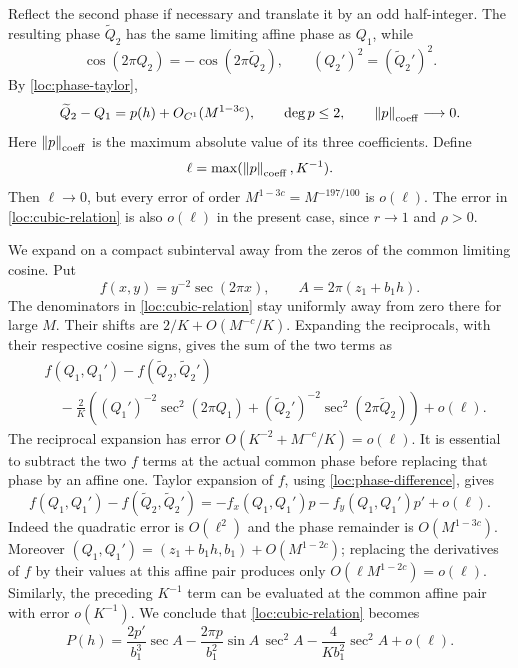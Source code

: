 Reflect the second phase if necessary and translate it by an odd
half-integer. The resulting phase $\widetilde Q_2$ has the same
limiting affine phase as $Q_1$, while
\[
 \cos(2\pi Q_2)=-\cos(2\pi\widetilde Q_2),\qquad
 (Q_2')^2=(\widetilde Q_2')^2.
\]
By \cref{loc:phase-taylor},
\begin{equation}
 \widetilde Q_2-Q_1=p(h)+O_{C^1}(M^{1-3c}),\qquad
 \deg p\le2,\qquad \left\lVert p\right\rVert_{\rm coeff}\longrightarrow0.
 \label{loc:phase-difference}
\end{equation}
Here $\left\lVert p\right\rVert_{\rm coeff}$ is the maximum absolute value of its
three coefficients. Define
\[
 \ell=\max(\left\lVert p\right\rVert_{\rm coeff},K^{-1}).
\]
Then $\ell\to0$, but every error of order $M^{1-3c}=M^{-197/100}$
is $o(\ell)$. The error in \cref{loc:cubic-relation} is also
$o(\ell)$ in the present case, since $r\to1$ and $\rho>0$.

We expand on a compact subinterval away from the zeros of the common
limiting cosine. Put
\[
 f(x,y)=y^{-2}\sec(2\pi x),\qquad
 A=2\pi(z_1+b_1h).
\]
The denominators in \cref{loc:cubic-relation} stay uniformly away
from zero there for large $M$. Their shifts are
$2/K+O(M^{-c}/K)$. Expanding the reciprocals, with their respective
cosine signs, gives the sum of the two terms as
\begin{align*}
 &f(Q_1,Q_1')-f(\widetilde Q_2,\widetilde Q_2')\\
 &\quad-\frac2K\left((Q_1')^{-2}\sec^2(2\pi Q_1)
            +(\widetilde Q_2')^{-2}\sec^2(2\pi\widetilde Q_2)\right)
       +o(\ell).
\end{align*}
The reciprocal expansion has error $O(K^{-2}+M^{-c}/K)=o(\ell)$.
It is essential to subtract the two $f$ terms at the actual common
phase before replacing that phase by an affine one. Taylor expansion
of $f$, using \cref{loc:phase-difference}, gives
\[
 f(Q_1,Q_1')-f(\widetilde Q_2,\widetilde Q_2')
 =-f_x(Q_1,Q_1')p-f_y(Q_1,Q_1')p'+o(\ell).
\]
Indeed the quadratic error is $O(\ell^2)$ and the phase remainder
is $O(M^{1-3c})$. Moreover
$(Q_1,Q_1')=(z_1+b_1h,b_1)+O(M^{1-2c})$; replacing the derivatives
of $f$ by their values at this affine pair produces only
$O(\ell M^{1-2c})=o(\ell)$. Similarly, the preceding $K^{-1}$ term
can be evaluated at the common affine pair with error $o(K^{-1})$.
We conclude that \cref{loc:cubic-relation} becomes
\begin{equation}
 P(h)=\frac{2p'}{b_1^3}\sec A
      -\frac{2\pi p}{b_1^2}\sin A\,\sec^2 A
      -\frac4{K b_1^2}\sec^2 A+o(\ell).
 \label{loc:opposite-expansion}
\end{equation}

